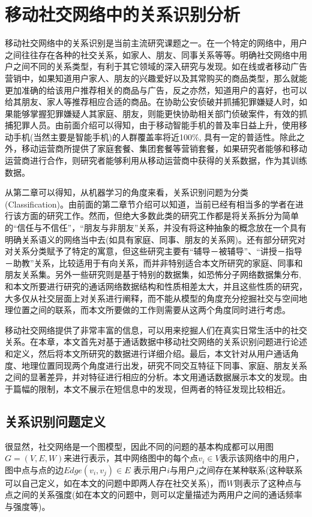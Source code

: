 \chapter{移动社交网络中的关系识别分析}

\qquad 移动社交网络中的关系识别是当前主流研究课题之一。在一个特定的网络中，用户之间往往存在各种的社交关系，如家人、朋友、同事关系等等。明确社交网络中用户之间不同的关系类型，有利于其它领域的深入研究与发现。如在线或者移动广告营销中，如果知道用户家人、朋友的兴趣爱好以及其常购买的商品类型，那么就能更加准确的给该用户推荐相关的商品与广告，反之亦然，知道用户的喜好，也可以给其朋友、家人等推荐相应合适的商品。在协助公安侦破并抓捕犯罪嫌疑人时，如果能够掌握犯罪嫌疑人其家庭、朋友，则能更快协助相关部门侦破案件，有效的抓捕犯罪人员。由前面介绍可以得知，由于移动智能手机的普及率日益上升，使用移动手机(当然主要是智能手机)的人群覆盖率将近100\%, 具有一定的普适性。除此之外，移动运营商所提供了家庭套餐、集团套餐等营销套餐，如果研究者能够和移动运营商进行合作，则研究者能够利用从移动运营商中获得的关系数据，作为其训练数据。

从第二章可以得知，从机器学习的角度来看，关系识别问题为分类(Classification)。由前面的第二章节介绍可以知道，当前已经有相当多的学者在进行该方面的研究工作。然而，但绝大多数此类的研究工作都是将关系拆分为简单的“信任与不信任”，“朋友与非朋友”关系，并没有将这种抽象的概念放在一个具有明确关系语义的网络当中去(如具有家庭、同事、朋友的关系网)。还有部分研究对对关系分类赋予了特定的寓意，但这些研究主要有“辅导－被辅导”、“讲授－指导－助教”关系，比较适用于有向关系，而并非特别适合本文所研究的家庭、同事和朋友关系集。另外一些研究则是基于特别的数据集，如恐怖分子网络数据集分布, 和本文所要进行研究的通话网络数据结构和性质相差太大，并且这些性质的研究，大多仅从社交层面上对关系进行阐释，而不能从模型的角度充分挖掘社交与空间地理位置之间的联系，而本文所要做的工作则需要从这两个角度同时进行考虑。


移动社交网络提供了非常丰富的信息，可以用来挖掘人们在真实日常生活中的社交关系。在本章，本文首先对基于通话数据中移动社交网络的关系识别问题进行论述和定义，然后将本文所研究的数据进行详细介绍。最后，本文针对从用户通话角度、地理位置同现两个角度进行出发，研究不同交互特征下同事、家庭、朋友关系之间的显著差异，并对特征进行相应的分析。本文用通话数据展示本文的发现。由于篇幅的限制，本文不展示在短信息中的发现，但两者的特征发现比较相近。

\section{关系识别问题定义}
很显然，社交网络是一个图模型，因此不同的问题的基本构成都可以用图$G = (V, E, W)$来进行表示，其中网络图中的每个点$ v_i \in V$表示该网络中的用户，图中点与点的边$Edge(v_i, v_j) \in E$ 表示用户$i$与用户$j$之间存在某种联系(这种联系可以自己定义，如在本文的问题中即两人存在社交关系)，而$W$则表示了这种点与点之间的关系强度(如在本文的问题中，则可以定量描述为两用户之间的通话频率与强度等)。


